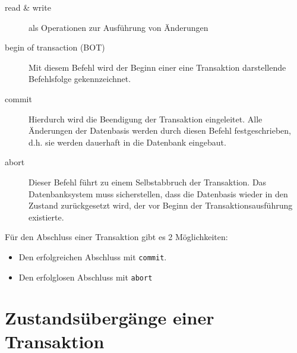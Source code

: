 \documentclass{lehramt-informatik-haupt}
\begin{document}
\begin{description}
\item[read \& write]

als Operationen zur Ausführung von Änderungen

\item[begin of transaction (BOT)]

Mit diesem Befehl wird der Beginn einer eine Transaktion darstellende
Befehlsfolge gekennzeichnet.

\item[commit]

Hierdurch wird die Beendigung der Transaktion eingeleitet. Alle
Änderungen der Datenbasis werden durch diesen Befehl festgeschrieben,
d.h. sie werden dauerhaft in die Datenbank eingebaut.

\item[abort]

Dieser Befehl führt zu einem Selbstabbruch der Transaktion. Das
Datenbanksystem muss sicherstellen, dass die Datenbasis wieder in den
Zustand zurückgesetzt wird, der vor Beginn der Transaktionsausführung
existierte.
\end{description}

Für den Abschluss einer Transaktion gibt es 2 Möglichkeiten:

\begin{itemize}
\item Den erfolgreichen Abschluss mit \texttt{commit}.
\item Den erfolglosen Abschluss mit \texttt{abort}
\end{itemize}

%

\section{Zustandsübergänge einer Transaktion}

\begin{quellen}
\item \cite[Kapitel 9.7, Seite 301]{kemper}
\item \cite[Seite 5]{db:fs:5}
\end{quellen}
\end{document}
